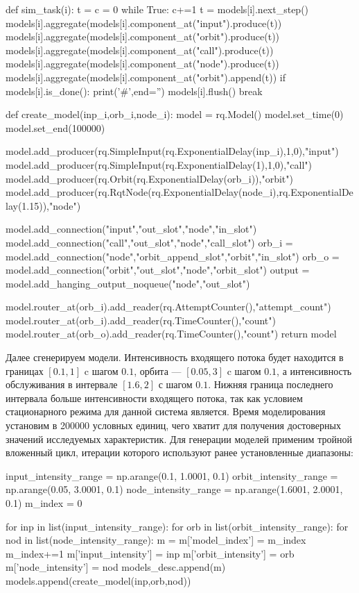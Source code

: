 \begin{pyin} 
def sim_task(i):
   t = c = 0
   while True:
      c+=1 
      t = models[i].next_step()
      models[i].aggregate(models[i].component_at("input").produce(t))
      models[i].aggregate(models[i].component_at("orbit").produce(t))
      models[i].aggregate(models[i].component_at("call").produce(t))
      models[i].aggregate(models[i].component_at("node").produce(t))
      models[i].aggregate(models[i].component_at("orbit").append(t))
      if models[i].is_done():
         print('#',end='')
         models[i].flush()
         break
\end{pyin}         

\begin{pyin}
def create_model(inp_i,orb_i,node_i):
model = rq.Model()
model.set_time(0) 
model.set_end(100000)

model.add_producer(rq.SimpleInput(rq.ExponentialDelay(inp_i),1,0),"input")
model.add_producer(rq.SimpleInput(rq.ExponentialDelay(1),1,0),"call")
model.add_producer(rq.Orbit(rq.ExponentialDelay(orb_i)),"orbit")
model.add_producer(rq.RqtNode(rq.ExponentialDelay(node_i),rq.ExponentialDelay(1.15)),"node")

model.add_connection("input","out_slot","node","in_slot")
model.add_connection("call","out_slot","node","call_slot")
orb_i = model.add_connection("node","orbit_append_slot","orbit","in_slot")
orb_o = model.add_connection("orbit","out_slot","node","orbit_slot")
output = model.add_hanging_output_noqueue("node","out_slot")

model.router_at(orb_i).add_reader(rq.AttemptCounter(),"attempt_count")
model.router_at(orb_i).add_reader(rq.TimeCounter(),"count")
model.router_at(orb_o).add_reader(rq.TimeCounter(),"count")
return model
\end{pyin}


Далее сгенерируем модели. Интенсивность входящего потока будет находится в границах $[0.1,1]$ c шагом $0.1$, орбита --- $[0.05,3]$ c шагом $0.1$, а интенсивность обслуживания в интервале $[1.6,2]$ с шагом $0.1$. Нижняя граница последнего интервала больше интенсивности входящего потока, так как условием стационарного режима для данной система является. Время моделирования установим в 200000 условных единиц, чего хватит для получения достоверных значений исследуемых характеристик. Для генерации моделей применим тройной вложенный цикл, итерации которого используют ранее установленные диапазоны:
\begin{pyin} 
input_intensity_range = np.arange(0.1, 1.0001, 0.1)
orbit_intensity_range = np.arange(0.05, 3.0001, 0.1)
node_intensity_range = np.arange(1.6001, 2.0001, 0.1)
m_index = 0

for inp in list(input_intensity_range):
   for orb in list(orbit_intensity_range):
      for nod in list(node_intensity_range):
         m = {}
         m['model_index'] = m_index
         m_index+=1
         m['input_intensity'] = inp
         m['orbit_intensity'] = orb
         m['node_intensity'] = nod
         models_desc.append(m)
         models.append(create_model(inp,orb,nod))
\end{pyin}

